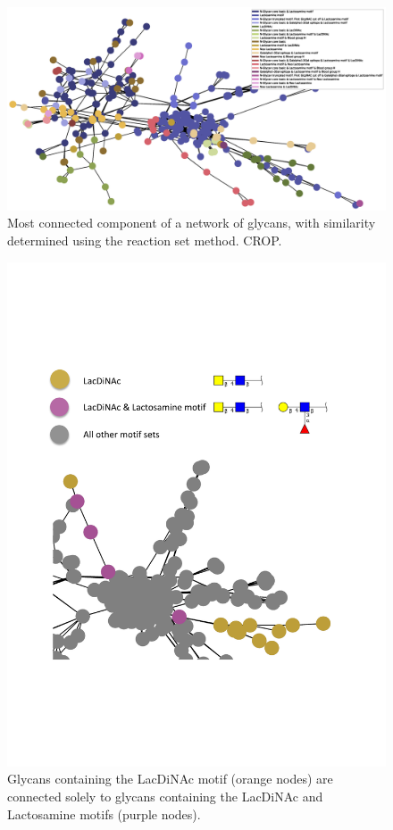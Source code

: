 \documentclass[12pt,a4paper]{article}
\begin{document}
\begin{figure}
\centering 
\includegraphics[scale=0.5]{threshold_87_conn_comp_1_method_set/threshold_87_conn_comp_1_method_set.eps} 
\caption{Most connected component of a network of glycans, with similarity determined using the reaction set method. CROP.}
\label{fig:threshold_87_conn_comp_1_method_set}
\end{figure}
\clearpage

\begin{figure}[H]
\centering 
\includegraphics[scale=0.9]{motif_similarity_exploration/LacDiNAc_vs_Lactosamine_motif_LacDiNAc.pdf} 
\caption{Glycans containing the LacDiNAc motif (orange nodes) are connected solely to glycans containing the LacDiNAc and Lactosamine motifs (purple nodes).}
\label{fig:LacDiNAc_vs_Lactosamine motif,LacDiNAc}
\end{figure}
\end{document}
